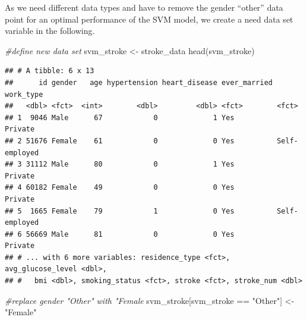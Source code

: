 \documentclass[
]{article}
\newenvironment{Shaded}{\begin{snugshade}}{\end{snugshade}}
\newcommand{\CommentTok}[1]{\textcolor[rgb]{0.56,0.35,0.01}{\textit{#1}}}
\newcommand{\ConstantTok}[1]{\textcolor[rgb]{0.00,0.00,0.00}{#1}}
\newcommand{\FunctionTok}[1]{\textcolor[rgb]{0.00,0.00,0.00}{#1}}
\newcommand{\NormalTok}[1]{#1}
\newcommand{\OtherTok}[1]{\textcolor[rgb]{0.56,0.35,0.01}{#1}}
\newcommand{\SpecialCharTok}[1]{\textcolor[rgb]{0.00,0.00,0.00}{#1}}
\newcommand{\StringTok}[1]{\textcolor[rgb]{0.31,0.60,0.02}{#1}}
\renewcommand{\=}[1]{\stackrel{#1}{=}}
\theoremstyle{definition}
\theoremstyle{remark}
\begin{document}
As we need different data types and have to remove the gender ``other'' data point for an optimal performance of the SVM model, we create a need data set variable in the following.

\begin{Shaded}
\begin{Highlighting}[]
\CommentTok{\#define new data set}
\NormalTok{svm\_stroke }\OtherTok{\textless{}{-}}\NormalTok{ stroke\_data}
\FunctionTok{head}\NormalTok{(svm\_stroke)}
\end{Highlighting}
\end{Shaded}

\begin{verbatim}
## # A tibble: 6 x 13
##      id gender   age hypertension heart_disease ever_married work_type    
##   <dbl> <fct>  <int>        <dbl>         <dbl> <fct>        <fct>        
## 1  9046 Male      67            0             1 Yes          Private      
## 2 51676 Female    61            0             0 Yes          Self-employed
## 3 31112 Male      80            0             1 Yes          Private      
## 4 60182 Female    49            0             0 Yes          Private      
## 5  1665 Female    79            1             0 Yes          Self-employed
## 6 56669 Male      81            0             0 Yes          Private      
## # ... with 6 more variables: residence_type <fct>, avg_glucose_level <dbl>,
## #   bmi <dbl>, smoking_status <fct>, stroke <fct>, stroke_num <dbl>
\end{verbatim}

\begin{Shaded}
\begin{Highlighting}[]
\CommentTok{\#replace gender "Other" with "Female}
\NormalTok{svm\_stroke[svm\_stroke }\SpecialCharTok{==} \StringTok{"Other"}\NormalTok{] }\OtherTok{\textless{}{-}} \StringTok{"Female"}
\end{Highlighting}
\end{Shaded}

\begin{Shaded}
\end{Shaded}
\end{document}
